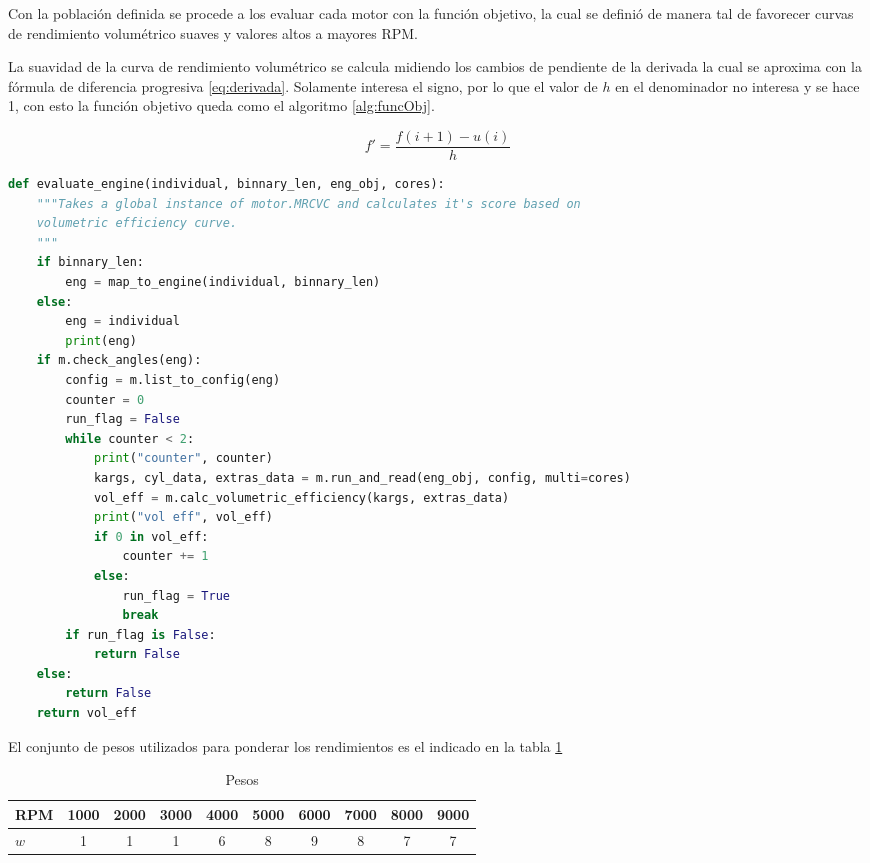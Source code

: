 
Con la población definida se procede a los evaluar cada motor con la función
objetivo, la cual se definió de manera tal de favorecer curvas de rendimiento
volumétrico suaves y valores altos a mayores RPM.

La suavidad de la curva de rendimiento volumétrico se calcula midiendo los
cambios de pendiente de la derivada la cual se aproxima con la fórmula de
diferencia progresiva \ref{eq:derivada}.
%
Solamente interesa el signo, por lo que el valor de $h$ en el denominador no
interesa y se hace 1, con esto la función objetivo queda como el algoritmo
\ref{alg:funcObj}.

\begin{equation}
  f' = \frac{f(i+1) - u(i)}{h}
  \label{eq:derivada}
\end{equation}

\begin{lstlisting}[language=Python]
def evaluate_engine(individual, binnary_len, eng_obj, cores):
    """Takes a global instance of motor.MRCVC and calculates it's score based on
    volumetric efficiency curve.
    """
    if binnary_len:
        eng = map_to_engine(individual, binnary_len)
    else:
        eng = individual
        print(eng)
    if m.check_angles(eng):
        config = m.list_to_config(eng)
        counter = 0
        run_flag = False
        while counter < 2:
            print("counter", counter)
            kargs, cyl_data, extras_data = m.run_and_read(eng_obj, config, multi=cores)
            vol_eff = m.calc_volumetric_efficiency(kargs, extras_data)
            print("vol eff", vol_eff)
            if 0 in vol_eff:
                counter += 1
            else:
                run_flag = True
                break
        if run_flag is False:
            return False
    else:
        return False
    return vol_eff
\end{lstlisting}

El conjunto de pesos utilizados para ponderar los rendimientos es el indicado
en la tabla \ref{tab:pesos}

\begin{table}
  \centering
  \begin{tabular}{lccccccccc} \toprule
      RPM & 1000 & 2000 & 3000 & 4000 & 5000 & 6000 & 7000 & 8000 & 9000 \\ \midrule
      $w$ & 1 & 1 & 1 & 6 & 8 & 9 & 8 & 7 & 7 \\ \bottomrule 
  \end{tabular}
  \caption{Pesos}
  \label{tab:pesos}
\end{table}


